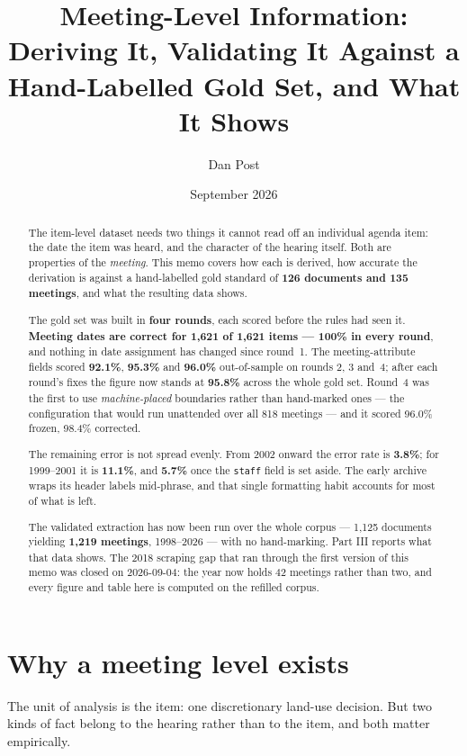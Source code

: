 \documentclass[11pt]{article}
\title{Meeting-Level Information:\\
Deriving It, Validating It Against a Hand-Labelled Gold Set, and What It Shows}
\author{Dan Post}
\date{September 2026}
\begin{document}
\maketitle

\begin{abstract}
\noindent
The item-level dataset needs two things it cannot read off an individual agenda item: the
date the item was heard, and the character of the hearing itself. Both are properties of
the \emph{meeting}. This memo covers how each is derived, how accurate the derivation is
against a hand-labelled gold standard of \textbf{126 documents and 135 meetings}, and what
the resulting data shows.

\medskip\noindent
The gold set was built in \textbf{four rounds}, each scored before the rules had seen it.
\textbf{Meeting dates are correct for 1{,}621 of 1{,}621 items --- 100\% in every round},
and nothing in date assignment has changed since round~1. The meeting-attribute fields
scored \textbf{92.1\%}, \textbf{95.3\%} and \textbf{96.0\%} out-of-sample on rounds 2, 3
and~4; after each round's fixes the figure now stands at \textbf{95.8\%} across the whole
gold set. Round~4 was the first to use \emph{machine-placed} boundaries rather than
hand-marked ones --- the configuration that would run unattended over all 818 meetings ---
and it scored 96.0\% frozen, 98.4\% corrected.

\medskip\noindent
The remaining error is not spread evenly. From 2002 onward the error rate is
\textbf{3.8\%}; for 1999--2001 it is \textbf{11.1\%}, and \textbf{5.7\%} once the
\texttt{staff} field is set aside. The early archive wraps its header labels mid-phrase,
and that single formatting habit accounts for most of what is left.

\medskip\noindent
The validated extraction has now been run over the whole corpus --- 1{,}125 documents
yielding \textbf{1{,}219 meetings}, 1998--2026 --- with no hand-marking. Part III reports
what that data shows. The 2018 scraping gap that ran through the first version of this memo
was closed on 2026-09-04: the year now holds 42 meetings rather than two, and every figure
and table here is computed on the refilled corpus.
\end{abstract}

\section{Why a meeting level exists}

The unit of analysis is the item: one discretionary land-use decision. But two kinds of
fact belong to the hearing rather than to the item, and both matter empirically.
\end{document}
